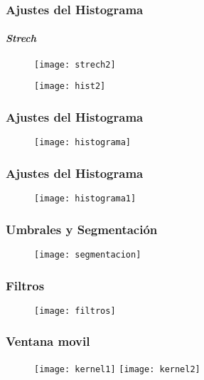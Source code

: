 \documentclass[14pt]{beamer}
\begin{document}
\begin{frame}
\frametitle{Ajustes del Histograma}
\framesubtitle{\emph{Strech}}
  \begin{figure}
    \centering
    \texttt{[image: strech2]}
  \end{figure}
\tiny{}
\end{frame}
\begin{frame}
  \begin{figure}
    \centering
    \texttt{[image: hist2]}
  \end{figure}
\tiny{}
\end{frame}
\begin{frame}
\frametitle{Ajustes del Histograma}
  \begin{figure}
    \centering
    \texttt{[image: histograma]}
  \end{figure}
\tiny{}
\end{frame}
\begin{frame}
\frametitle{Ajustes del Histograma}
  \begin{figure}
    \centering
    \texttt{[image: histograma1]}
  \end{figure}
\tiny{}
\end{frame}
\begin{frame}
\frametitle{Umbrales y Segmentación}
  \begin{figure}
    \centering
    \texttt{[image: segmentacion]}
  \end{figure}
\tiny{}
\end{frame}
\begin{frame}
\frametitle{Filtros}
  \begin{figure}
    \centering
    \texttt{[image: filtros]}
  \end{figure}
\tiny{}
\end{frame}
\begin{frame}
\frametitle{Ventana movil}
  \begin{figure}
    \texttt{[image: kernel1]}
    \texttt{[image: kernel2]}
  \end{figure}
\tiny{}
\end{frame}
\end{document}
